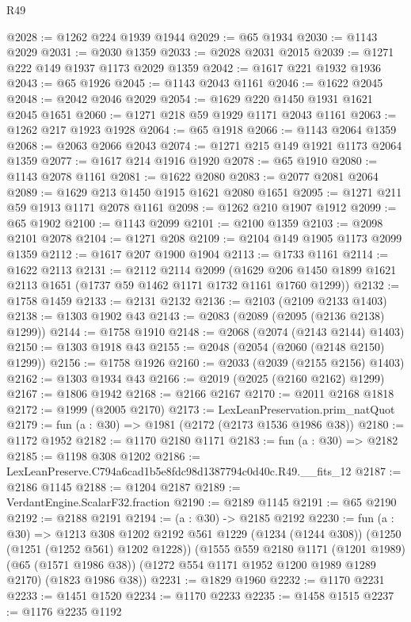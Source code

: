 \begin{lexlean}{R49}
\begin{coremodule}
@2028 := @1262 @224 @1939 @1944
@2029 := @65 @1934
@2030 := @1143 @2029
@2031 := @2030 @1359
@2033 := @2028 @2031 @2015
@2039 := @1271 @222 @149 @1937 @1173 @2029 @1359
@2042 := @1617 @221 @1932 @1936
@2043 := @65 @1926
@2045 := @1143 @2043 @1161
@2046 := @1622 @2045
@2048 := @2042 @2046 @2029
@2054 := @1629 @220 @1450 @1931 @1621 @2045 @1651
@2060 := @1271 @218 @59 @1929 @1171 @2043 @1161
@2063 := @1262 @217 @1923 @1928
@2064 := @65 @1918
@2066 := @1143 @2064 @1359
@2068 := @2063 @2066 @2043
@2074 := @1271 @215 @149 @1921 @1173 @2064 @1359
@2077 := @1617 @214 @1916 @1920
@2078 := @65 @1910
@2080 := @1143 @2078 @1161
@2081 := @1622 @2080
@2083 := @2077 @2081 @2064
@2089 := @1629 @213 @1450 @1915 @1621 @2080 @1651
@2095 := @1271 @211 @59 @1913 @1171 @2078 @1161
@2098 := @1262 @210 @1907 @1912
@2099 := @65 @1902
@2100 := @1143 @2099
@2101 := @2100 @1359
@2103 := @2098 @2101 @2078
@2104 := @1271 @208
@2109 := @2104 @149 @1905 @1173 @2099 @1359
@2112 := @1617 @207 @1900 @1904
@2113 := @1733 @1161
@2114 := @1622 @2113
@2131 := @2112
    @2114
    @2099
    (@1629 @206 @1450 @1899 @1621 @2113 @1651 (@1737 @59 @1462 @1171 @1732 @1161 @1760 @1299))
@2132 := @1758 @1459
@2133 := @2131 @2132
@2136 := @2103 (@2109 @2133 @1403)
@2138 := @1303 @1902 @43
@2143 := @2083 (@2089 (@2095 (@2136 @2138) @1299))
@2144 := @1758 @1910
@2148 := @2068 (@2074 (@2143 @2144) @1403)
@2150 := @1303 @1918 @43
@2155 := @2048 (@2054 (@2060 (@2148 @2150) @1299))
@2156 := @1758 @1926
@2160 := @2033 (@2039 (@2155 @2156) @1403)
@2162 := @1303 @1934 @43
@2166 := @2019 (@2025 (@2160 @2162) @1299)
@2167 := @1806 @1942
@2168 := @2166 @2167
@2170 := @2011 @2168 @1818
@2172 := @1999 (@2005 @2170)
@2173 := LexLeanPreservation.prim_natQuot
@2179 := fun (a : @30) => @1981 (@2172 (@2173 @1536 @1986 @38))
@2180 := @1172 @1952
@2182 := @1170 @2180 @1171
@2183 := fun (a : @30) => @2182
@2185 := @1198 @308 @1202
@2186 := LexLeanPreserve.C794a6cad1b5e8fdc98d1387794c0d40c.R49.__fits_12
@2187 := @2186 @1145
@2188 := @1204 @2187
@2189 := VerdantEngine.ScalarF32.fraction
@2190 := @2189 @1145
@2191 := @65 @2190
@2192 := @2188 @2191
@2194 := (a : @30) -> @2185 @2192
@2230 := fun (a : @30) =>
  @1213
    @308
    @1202
    @2192
    @561
    @1229
    (@1234 (@1244 @308))
    (@1250 (@1251 (@1252 @561) @1202 @1228))
    (@1555
      @559
      @2180
      @1171
      (@1201 @1989)
      (@65 (@1571 @1986 @38))
      (@1272 @554 @1171 @1952 @1200 @1989 @1289 @2170)
      (@1823 @1986 @38))
@2231 := @1829 @1960
@2232 := @1170 @2231
@2233 := @1451 @1520
@2234 := @1170 @2233
@2235 := @1458 @1515
@2237 := @1176 @2235 @1192

\end{coremodule}
\end{lexlean}
